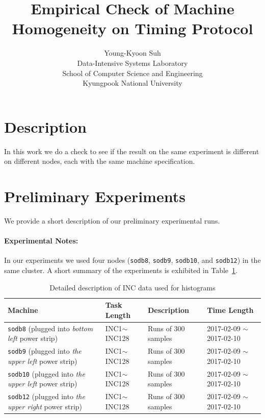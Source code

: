 \documentclass[10pt]{article}
\begin{document}
\title{Empirical Check of Machine Homogeneity on Timing Protocol}

\author{
Young-Kyoon Suh\\
Data-Intensive Systems Laboratory\\
School of Computer Science and Engineering\\
Kyungpook National University\\
}
\maketitle

\section{Description}
In this work we do a check to see if the result on the same experiment is different 
on different nodes, each with the same machine specification.

\section{Preliminary Experiments}

We provide a short description of our preliminary experimental runs. 

\paragraph{Experimental Notes:} In our experiments 
we used four nodes ({\tt sodb8}, {\tt sodb9}, {\tt sodb10}, and {\tt sodb12}) in the same cluster. 
A short summary of the experiments is exhibited in Table~\ref{tab:exp_notes}.

\begin{table}[h]
\begin{center}
\begin{tabular}{|p{4cm}|p{3cm}|p{4cm}|p{4cm}|} \hline
Machine & Task Length & Description & Time Length\\ \hline
{\tt sodb8} (plugged into {\em bottom left} power strip) & INC1$\sim$INC128 & Runs of 300 samples & 2017-02-09 $\sim$ 2017-02-10\\ \hline
{\tt sodb9}  (plugged into {\em the upper left} power strip)  &  INC1$\sim$INC128 & Runs of 300 samples & 2017-02-09 $\sim$ 2017-02-10\\ \hline
{\tt sodb10}  (plugged into {\em the upper left} power strip)  & INC1$\sim$INC128 & Runs of 300 samples & 2017-02-09 $\sim$ 2017-02-10\\ \hline
{\tt sodb12}  (plugged into {\em the upper right} power strip)  & INC1$\sim$INC128 & Runs of 300 samples & 2017-02-09 $\sim$ 2017-02-10\\ \hline
\end{tabular}
\end{center}
\vspace{-.2in}
\caption{Detailed description of INC data used for histograms\label{tab:exp_notes}}
\end{table}
\end{document}
